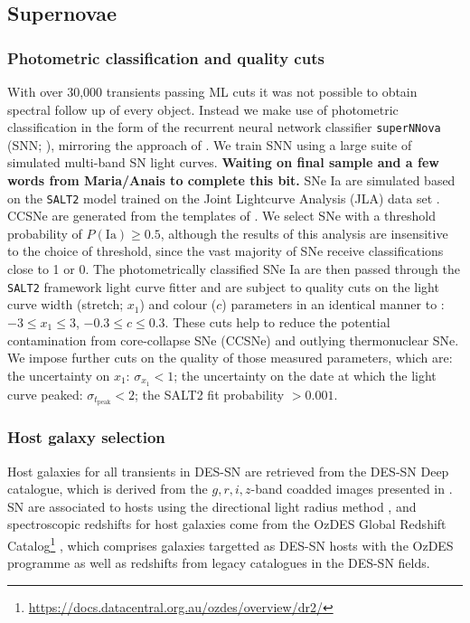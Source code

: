 \documentclass[fleqn,usenatbib]{mnras}
\begin{document}
\subsection{Supernovae \label{subsec:host_sample}}
\subsubsection{Photometric classification and quality cuts \label{subsubsec:sn_classify}}
With over 30,000 transients passing ML cuts it was not possible to obtain spectral follow up of every object. Instead we make use of photometric classification in the form of the recurrent neural network classifier \texttt{superNNova} (SNN; \citealt{Moller2019}), mirroring the approach of \citet{Scolnic2020}. We train SNN using a large suite of simulated multi-band SN light curves. \textbf{Waiting on final sample and a few words from Maria/Anais to complete this bit.} SNe Ia are simulated based on the \texttt{SALT2} model \citep{Guy2007} trained on the Joint Lightcurve Analysis (JLA) data set \citep{Betoule2014}. CCSNe are generated from the templates of \citet{Vincenzi2019}. We select SNe with a threshold probability of $P(\mathrm{Ia})\geq0.5$, although the results of this analysis are insensitive to the choice of threshold, since the vast majority of SNe receive classifications close to 1 or 0. The photometrically classified SNe Ia are then passed through the \texttt{SALT2} framework light curve fitter and are subject to quality cuts on the light curve width (stretch; $x_1$) and colour ($c$) parameters in an identical manner to \citet{Vincenzi2020}: $-3 \leq x_1 \leq 3$, $-0.3 \leq c \leq 0.3$. These cuts help to reduce the potential contamination from core-collapse SNe (CCSNe) and outlying thermonuclear SNe. We impose further cuts on the quality of those measured parameters, which are: the uncertainty on $x_1$: $\sigma_{x_1} <1$; the uncertainty on the date at which the light curve peaked: $\sigma_{t_{\mathrm{peak}}} <2$; the SALT2 fit probability $>0.001$.  

\subsubsection{Host galaxy selection \label{subsubsec:sn_hosts}}
Host galaxies for all transients in DES-SN are retrieved from the DES-SN Deep catalogue, which is derived from the $g, r, i, z$-band coadded images presented in \citet{Wiseman2020}. SN are associated to hosts using the directional light radius method \citep[e.g.][]{Sullivan2006,Gupta2016}, and spectroscopic redshifts for host galaxies come from the OzDES Global Redshift Catalog\footnote{\url{https://docs.datacentral.org.au/ozdes/overview/dr2/}} \citep{Yuan2015,Childress2017,Lidman2020}, which comprises galaxies targetted as DES-SN hosts with the OzDES programme as well as redshifts from legacy catalogues in the DES-SN fields.
\end{document}
